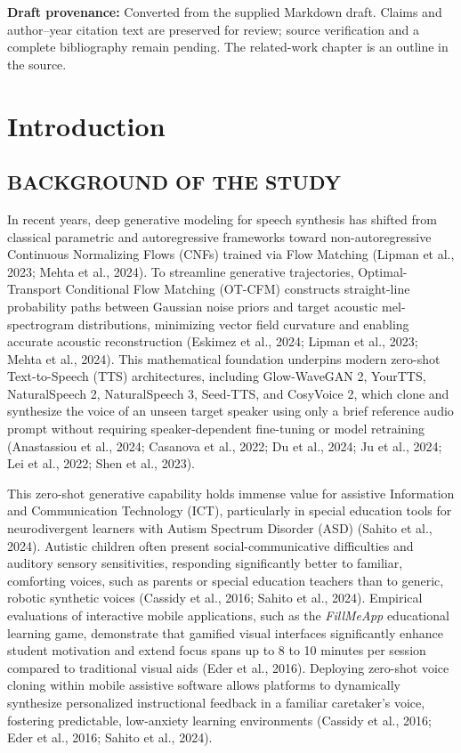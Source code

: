 \documentclass[12pt,a4paper,oneside]{report}
\title{\thesistitle}
\author{\parbox{0.9\textwidth}{\centering\thesisauthors}}
\date{Working draft supplied 9 October 2026}
\begin{document}
\maketitle
\noindent\textbf{Draft provenance:} Converted from the supplied Markdown draft. Claims and author--year citation text are preserved for review; source verification and a complete bibliography remain pending. The related-work chapter is an outline in the source.
\tableofcontents
\chapter{Introduction}

\section{BACKGROUND OF THE STUDY}

In recent years, deep generative modeling for speech synthesis has shifted from classical parametric and autoregressive frameworks toward non-autoregressive Continuous Normalizing Flows (CNFs) trained via Flow Matching (Lipman et al., 2023; Mehta et al., 2024). To streamline generative trajectories, Optimal-Transport Conditional Flow Matching (OT-CFM) constructs straight-line probability paths between Gaussian noise priors and target acoustic mel-spectrogram distributions, minimizing vector field curvature and enabling accurate acoustic reconstruction (Eskimez et al., 2024; Lipman et al., 2023; Mehta et al., 2024). This mathematical foundation underpins modern zero-shot Text-to-Speech (TTS) architectures, including Glow-WaveGAN 2, YourTTS, NaturalSpeech 2, NaturalSpeech 3, Seed-TTS, and CosyVoice 2, which clone and synthesize the voice of an unseen target speaker using only a brief reference audio prompt without requiring speaker-dependent fine-tuning or model retraining (Anastassiou et al., 2024; Casanova et al., 2022; Du et al., 2024; Ju et al., 2024; Lei et al., 2022; Shen et al., 2023).

This zero-shot generative capability holds immense value for assistive Information and Communication Technology (ICT), particularly in special education tools for neurodivergent learners with Autism Spectrum Disorder (ASD) (Sahito et al., 2024). Autistic children often present social-communicative difficulties and auditory sensory sensitivities, responding significantly better to familiar, comforting voices, such as parents or special education teachers than to generic, robotic synthetic voices (Cassidy et al., 2016; Sahito et al., 2024). Empirical evaluations of interactive mobile applications, such as the \emph{FillMeApp }educational learning game, demonstrate that gamified visual interfaces significantly enhance student motivation and extend focus spans up to 8 to 10 minutes per session compared to traditional visual aids (Eder et al., 2016). Deploying zero-shot voice cloning within mobile assistive software allows platforms to dynamically synthesize personalized instructional feedback in a familiar caretaker's voice, fostering predictable, low-anxiety learning environments (Cassidy et al., 2016; Eder et al., 2016; Sahito et al., 2024).
\end{document}
